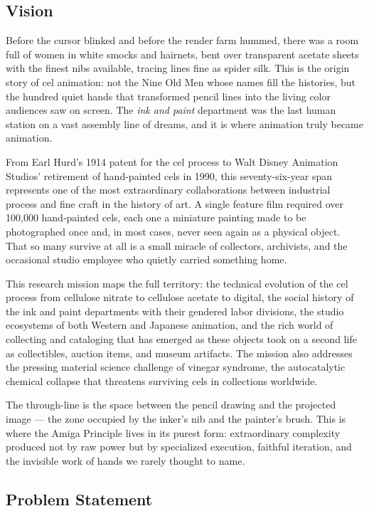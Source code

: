 \documentclass[11pt,letterpaper]{article}
\begin{document}
\subsection{Vision}

Before the cursor blinked and before the render farm hummed, there was a room full of women in white smocks and hairnets, bent over transparent acetate sheets with the finest nibs available, tracing lines fine as spider silk. This is the origin story of cel animation: not the Nine Old Men whose names fill the histories, but the hundred quiet hands that transformed pencil lines into the living color audiences saw on screen. The \textit{ink and paint} department was the last human station on a vast assembly line of dreams, and it is where animation truly became animation.

From Earl Hurd's 1914 patent for the cel process to Walt Disney Animation Studios' retirement of hand-painted cels in 1990, this seventy-six-year span represents one of the most extraordinary collaborations between industrial process and fine craft in the history of art. A single feature film required over 100,000 hand-painted cels, each one a miniature painting made to be photographed once and, in most cases, never seen again as a physical object. That so many survive at all is a small miracle of collectors, archivists, and the occasional studio employee who quietly carried something home.

This research mission maps the full territory: the technical evolution of the cel process from cellulose nitrate to cellulose acetate to digital, the social history of the ink and paint departments with their gendered labor divisions, the studio ecosystems of both Western and Japanese animation, and the rich world of collecting and cataloging that has emerged as these objects took on a second life as collectibles, auction items, and museum artifacts. The mission also addresses the pressing material science challenge of vinegar syndrome, the autocatalytic chemical collapse that threatens surviving cels in collections worldwide.

The through-line is the space between the pencil drawing and the projected image --- the zone occupied by the inker's nib and the painter's brush. This is where the Amiga Principle lives in its purest form: extraordinary complexity produced not by raw power but by specialized execution, faithful iteration, and the invisible work of hands we rarely thought to name.

\subsection{Problem Statement}
\end{document}
